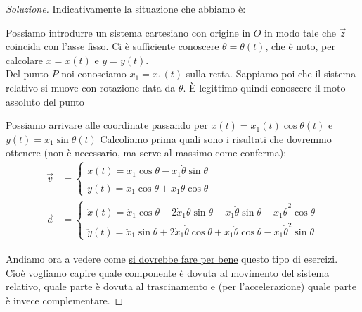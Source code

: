 \documentclass[11pt,a4paper,twoside]{article}
\theoremstyle{definition}
\newenvironment{sol}
	{\renewcommand\qedsymbol{$\blacksquare$}\begin{proof}[Soluzione]}
	{\end{proof}}
\begin{document}
\begin{sol}
	Indicativamente la situazione che abbiamo è:
	\begin{center}
	\end{center}
	Possiamo introdurre un sistema cartesiano con origine in $O$ in modo tale che $\vec z$ coincida con l'asse fisso. Ci è sufficiente conoscere $\theta = \theta(t)$, che è noto, per calcolare $x=x(t)$ e $y=y(t)$.\\
	Del punto $P$ noi conosciamo $x_1 = x_1(t)$ sulla retta. Sappiamo poi che il sistema relativo si muove con rotazione data da $\theta$. È legittimo quindi conoscere il moto assoluto del punto

	Possiamo arrivare alle coordinate passando per $x(t) = x_1(t)\cos\theta(t)$ e $y (t) = x_1\sin\theta(t)$
	Calcoliamo prima quali sono i risultati che dovremmo ottenere (non è necessario, ma serve al massimo come conferma):
	\begin{align*}
		\vec v &=
		\begin{cases}
			\dot x(t) = \dot x_1 \cos \theta - x_1 \dot \theta \sin \theta\\
			\dot y(t) = \dot x_1 \cos \theta + x_1 \dot \theta \cos \theta
		\end{cases}\\
		\vec a &=
		\begin{cases}
			\ddot x(t) = \ddot x_1 \cos \theta - 2 \dot x_1 \dot \theta \sin \theta - x_1 \ddot \theta \sin \theta - x_1 \dot \theta^2 \cos \theta\\
			\ddot y(t) = \ddot x_1 \sin \theta + 2 \dot x_1 \dot \theta \cos \theta + x_1 \ddot \theta \cos \theta - x_1 \dot \theta^2 \sin \theta
		\end{cases}
	\end{align*}

	Andiamo ora a vedere come \underline{si dovrebbe fare per bene} questo tipo di esercizi. Cioè vogliamo capire quale componente è dovuta al movimento del sistema relativo, quale parte è dovuta al trascinamento e (per l'accelerazione) quale parte è invece complementare.


\end{sol}
\end{document}
